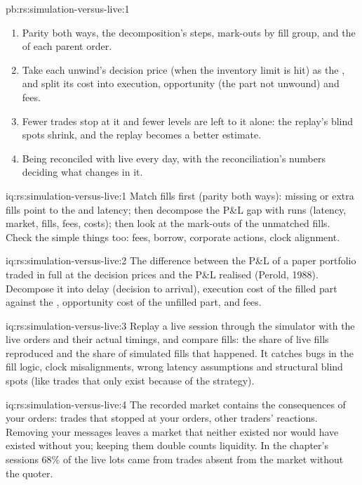 \begin{solution}{pb:rs:simulation-versus-live:1}
\begin{enumerate}
\item Parity both ways, the decomposition's steps, mark-outs by fill group, and the  of each parent order.
\item Take each unwind's decision price (when the inventory limit is hit) as the , and split its cost into execution, opportunity (the part not unwound) and fees.
\item Fewer trades stop at it and fewer levels are left to it alone: the replay's blind spots shrink, and the replay becomes a better estimate.
\item Being reconciled with live every day, with the reconciliation's numbers deciding what changes in it.
\end{enumerate}
\end{solution}

\begin{solution}{iq:rs:simulation-versus-live:1}
Match fills first (parity both ways): missing or extra fills point to the  and latency; then decompose the P\&L gap with runs (latency, market, fills, fees, costs);
then look at the mark-outs of the unmatched fills. Check the simple things too: fees, borrow, corporate actions, clock alignment.
\end{solution}

\begin{solution}{iq:rs:simulation-versus-live:2}
The difference between the P\&L of a paper portfolio traded in full at the decision prices and the P\&L realised (Perold, 1988). Decompose it into delay (decision to
arrival), execution cost of the filled part against the , opportunity cost of the unfilled part, and fees.
\end{solution}

\begin{solution}{iq:rs:simulation-versus-live:3}
Replay a live session through the simulator with the live orders and their actual timings, and compare fills: the share of live fills reproduced and the share of simulated
fills that happened. It catches bugs in the fill logic, clock misalignments, wrong latency assumptions and structural blind spots (like trades that only exist because of
the strategy).
\end{solution}

\begin{solution}{iq:rs:simulation-versus-live:4}
The recorded market contains the consequences of your orders: trades that stopped at your orders, other traders' reactions. Removing your messages leaves a market that
neither existed nor would have existed without you; keeping them double counts liquidity. In the chapter's sessions 68\% of the live lots came from trades absent from the
market without the quoter.
\end{solution}


